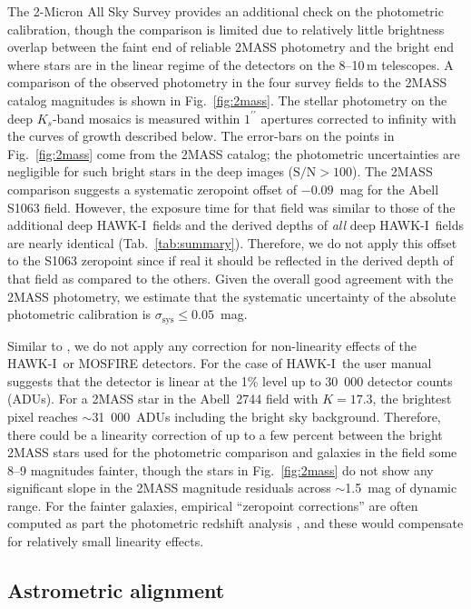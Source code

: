 \documentclass[preprint2]{aastex6}
\gdef\arcsec{^{\prime\prime}}
\gdef\HAWKI{\mbox{HAWK-I}}
\begin{document}
The 2-Micron All Sky Survey \citep[2MASS;][]{2mass} provides an additional check on the photometric calibration, though the comparison is limited due to relatively little brightness overlap between the faint end of reliable 2MASS photometry and the bright end where stars are in the linear regime of the detectors on the 8--10\,m telescopes.  A comparison of the observed photometry in the four survey fields to the 2MASS catalog magnitudes is shown in Fig.~\ref{fig:2mass}.  The stellar photometry on the deep $K_s$-band mosaics is measured within $1\arcsec$ apertures corrected to infinity with the curves of growth described below.  The error-bars on the points in Fig.~\ref{fig:2mass} come from the 2MASS catalog; the photometric uncertainties are negligible for such bright stars in the deep images ($\mathrm{S/N}>100$).  The 2MASS comparison suggests a systematic zeropoint offset of $-0.09$~mag for the Abell S1063 field.  However, the exposure time for that field was similar to those of the additional deep \HAWKI\ fields and the derived depths of \textit{all} deep \HAWKI\ fields are nearly identical (Tab.~\ref{tab:summary}).  Therefore, we do not apply this offset to the S1063 zeropoint since if real it should be reflected in the derived depth of that field as compared to the others.  Given the overall good agreement with the 2MASS photometry, we estimate that the systematic uncertainty of the absolute photometric calibration is $\sigma_\mathrm{sys}\leq0.05$~mag.  

Similar to \cite{hugs}, we do not apply any correction for non-linearity effects of the \HAWKI\ or MOSFIRE detectors.  For the case of \HAWKI\, the user manual suggests that the detector is linear at the 1\% level up to 30~000 detector counts (ADUs).  For a 2MASS star in the Abell~2744 field with $K=17.3$, the brightest pixel reaches $\sim$31~000~ADUs including the bright sky background.  Therefore, there could be a linearity correction of up to a few percent between the bright 2MASS stars used for the photometric comparison and galaxies in the field some 8--9 magnitudes fainter, though the stars in Fig.~\ref{fig:2mass} do not show any significant slope in the 2MASS magnitude residuals across $\sim$1.5~mag of dynamic range.  For the fainter galaxies, empirical ``zeropoint corrections'' are often computed as part the photometric redshift analysis \citep[e.g., ][]{skelton:14}, and these would compensate for relatively small linearity effects.  

\subsection{Astrometric alignment}
\label{s:astrometry}
\end{document}
